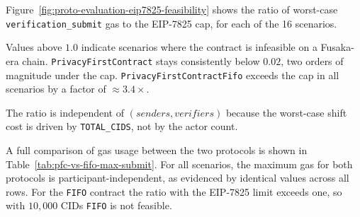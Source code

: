 Figure~\ref{fig:proto-evaluation-eip7825-feasibility} shows the ratio of worst-case \texttt{verification\_submit} gas to the
EIP-7825 cap, for each of the 16 scenarios.

Values above $1.0$ indicate scenarios where the contract is infeasible on a Fusaka-era chain.
\texttt{PrivacyFirstContract} stays consistently below $0.02$, two orders of magnitude under the cap.
\texttt{PrivacyFirstContractFifo} exceeds the cap in all scenarios by a factor of $\approx 3.4\times$.

The ratio is independent of \((senders, verifiers)\) because the
worst-case shift cost is driven by \texttt{TOTAL\_CIDS}, not by the
actor count.

A full comparison of gas usage between the two protocols is shown in Table~\ref{tab:pfc-vs-fifo-max-submit}. For all scenarios, the maximum gas for both protocols is participant-independent, as evidenced by identical values across all rows.
For the \texttt{FIFO} contract the ratio with the EIP-7825 limit exceeds one, so with $10,000$ CIDs \texttt{FIFO} is not feasible.

